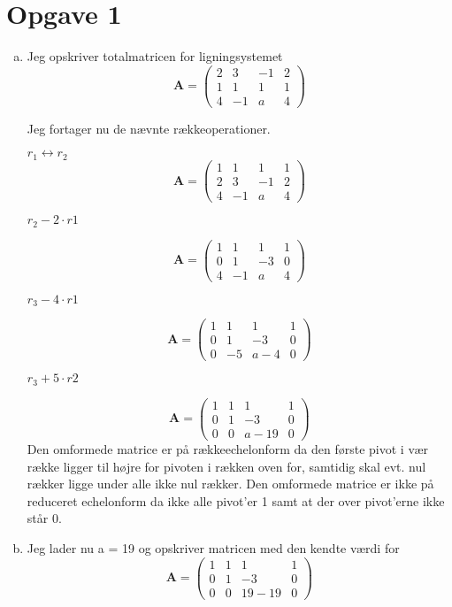 \documentclass[12pt]{article}
\begin{document}
\section{Opgave 1}
\begin{enumerate}[(a)]
\item Jeg opskriver totalmatricen for ligningsystemet
$$
\mathbf A=
\left(\begin{array}{cccc}
2&3&-1&2\\1&1&1&1\\4&-1&a&4
\end{array}\right)
$$

	Jeg fortager nu de nævnte rækkeoperationer.
	 
	$	r_{1} \leftrightarrow r_{2}$ 
$$
\mathbf A=
\left(\begin{array}{cccc}
1&1&1&1
\\
2&3&-1&2
\\
4&-1&a&4
\end{array}\right)
$$
	
		$r_{2} - 2 \cdot r1$

$$
\mathbf A=
\left(\begin{array}{cccc}
1&1&1&1
\\
0&1&-3&0
\\
4&-1&a&4
\end{array}\right)
$$
		
		$r_{3} - 4 \cdot r1$

$$
\mathbf A=
\left(\begin{array}{cccc}
1&1&1&1
\\
0&1&-3&0
\\
0&-5&a-4&0
\end{array}\right)
$$

		$r_{3} + 5 \cdot r2$

$$
\mathbf A=
\left(\begin{array}{cccc}
1&1&1&1
\\
0&1&-3&0
\\
0&0&a-19&0
\end{array}\right)
$$
Den omformede matrice er på rækkeechelonform da den første pivot i vær række
ligger til højre for pivoten i rækken oven for, samtidig skal evt. nul rækker ligge under alle ikke nul
rækker. Den omformede matrice er ikke på reduceret echelonform da ikke alle
pivot’er 1 samt at der over pivot'erne ikke står 0.



\item Jeg lader nu a = 19 og opskriver matricen med den kendte værdi for
$$
\mathbf A=
\left(\begin{array}{cccc}
1&1&1&1
\\
0&1&-3&0
\\
0&0&19-19&0
\end{array}\right)
$$


\end{enumerate}
\end{document}
